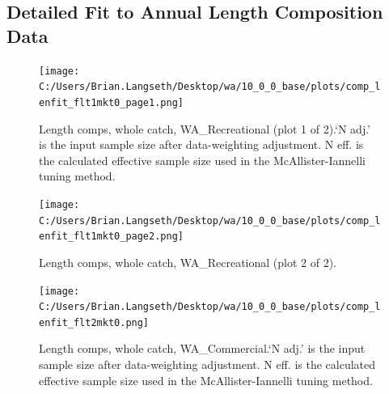 \documentclass[11pt,
  english,
  letterpaper,
]{article}
\begin{document}
\hypertarget{append_a}{%
\subsection{Detailed Fit to Annual Length Composition Data}\label{append_a}}

\leavevmode\tagmcend\tagstructend


\begin{figure}
\centering
\texttt{[image: C:/Users/Brian.Langseth/Desktop/wa/10\_0\_0\_base/plots/comp\_lenfit\_flt1mkt0\_page1.png]}
\caption{Length comps, whole catch, WA\_Recreational (plot 1 of 2).`N adj.' is the input sample size after data-weighting adjustment. N eff. is the calculated effective sample size used in the McAllister-Iannelli tuning method.\label{fig:comp_lenfit_flt1mkt0_page1}}
\end{figure}

\tagmcend\tagstructend


\begin{figure}
\centering
\texttt{[image: C:/Users/Brian.Langseth/Desktop/wa/10\_0\_0\_base/plots/comp\_lenfit\_flt1mkt0\_page2.png]}
\caption{Length comps, whole catch, WA\_Recreational (plot 2 of 2).\label{fig:comp_lenfit_flt1mkt0_page2}}
\end{figure}

\tagmcend\tagstructend


\begin{figure}
\centering
\texttt{[image: C:/Users/Brian.Langseth/Desktop/wa/10\_0\_0\_base/plots/comp\_lenfit\_flt2mkt0.png]}
\caption{Length comps, whole catch, WA\_Commercial.`N adj.' is the input sample size after data-weighting adjustment. N eff. is the calculated effective sample size used in the McAllister-Iannelli tuning method.\label{fig:comp_lenfit_flt2mkt0}}
\end{figure}

\tagmcend\tagstructend
\end{document}
